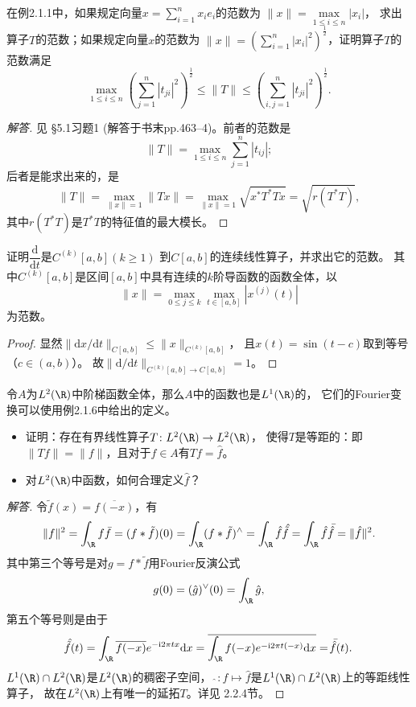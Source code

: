 \begin{3}
    在例2.1.1中，如果规定向量$\displaystyle x=\sum_{i=1}^n x_ie_i$的范数为
    $\|x\|=\max\limits_{1 \leqslant i \leqslant n}|x_i|$，
    求出算子$T$的范数；如果规定向量$x$的范数为
    $\displaystyle \|x\|=\left(\sum_{i=1}^n |x_i|^2\right)^\frac{1}{2}$，证明算子$T$的范数满足
    \[\max_{1 \leqslant i \leqslant n}\left(\sum_{j=1}^n |t_{ji}|^2\right)^\frac{1}{2}
    \leqslant\|T\|\leqslant\left(\sum_{i,j=1}^n |t_{ji}|^2\right)^\frac{1}{2}.\]
\end{3}
\begin{proof}[解答]
    见\cite{Xia} \S 5.1习题1 (解答于书末pp.463--4)。前者的范数是
    \[\|T\|=\max_{1 \leqslant i \leqslant n}\sum_{j=1}^n|t_{ij}|;\]
    后者是能求出来的，是
    \[\|T\|=\max_{\|x\|=1}\|Tx\|=\max_{\|x\|=1}\sqrt{x^*T^*Tx}=\sqrt{r(T^*T)},\]
    其中$r(T^*T)$是$T^*T$的特征值的最大模长。
\end{proof}

\begin{6}
    证明$\dfrac{\mathrm{d}}{\mathrm{d}t}$是$C^{(k)}[a,b](k\geqslant1)$
    到$C[a,b]$的连续线性算子，并求出它的范数。
    其中$C^{(k)}[a,b]$是区间$[a,b]$中具有连续的$k$阶导函数的函数全体，以
    \[\|x\|=\max_{0 \leqslant j \leqslant k}\max_{t\in[a,b]}|x^{(j)}(t)|\]
    为范数。
\end{6}
\begin{proof}
    显然$\|\mathrm{d}x/\mathrm{d}t\|_{C[a,b]}\leqslant\|x\|_{C^{(k)}[a,b]}$，
    且$x(t)=\sin(t-c)$取到等号（$c\in(a,b)$）。
    故$\|\mathrm{d}/\mathrm{d}t\|_{C^{(k)}[a,b] \to C[a,b]}=1$。
\end{proof}

\begin{8}
    令$A$为$L^2(\R)$中阶梯函数全体，那么$A$中的函数也是$L^1(\R)$的，
    它们的Fourier变换可以使用例2.1.6中给出的定义。
    \begin{itemize}
        \item[(i)] 证明：存在有界线性算子$T\colon L^2(\R) \to L^2(\R)$，
        使得$T$是等距的：即$\|Tf\|=\|f\|$，且对于$f \in A$有$Tf=\hat{f}$。
        \item[(ii)] 对$L^2(\R)$中函数，如何合理定义$\hat{f}$？
    \end{itemize}
\end{8}
\begin{proof}[解答]
    令$\tilde{f}(x)=\overline{f(-x)}$，有
    \[\|f\|^2=\int_{\R}f\bar{f}=(f*\tilde{f})(0)
    =\int_{\R}(f*\tilde{f})^\wedge=\int_{\R}\hat{f}\,\hat{\!\tilde{f}}
    =\int_{\R}\hat{f}\,\bar{\!\hat{f}}=\|\hat{f}\|^2.\]
    其中第三个等号是对$g=f*\tilde{f}$用Fourier反演公式
    \[g(0)=(\hat{g})^\vee(0)=\int_{\R}\hat{g},\]
    第五个等号则是由于
    \[\hat{\!\tilde{f}}(t)=\int_{\R}\overline{f(-x)}e^{-\mathrm{i}2\pi tx}\mathrm{d}x
    =\overline{\int_{\R}f(-x)e^{-\mathrm{i}2\pi t(-x)}\mathrm{d}x}=\bar{\!\hat{f}}(t).\]
    $L^1(\R) \cap L^2(\R)$是$L^2(\R)$的稠密子空间，
    $\hat{\ }\colon f\mapsto\hat{f}$是$L^1(\R) \cap L^2(\R)$上的等距线性算子，
    故在$L^2(\R)$上有唯一的延拓$T$。详见\cite{Gr} 2.2.4节。
\end{proof}

